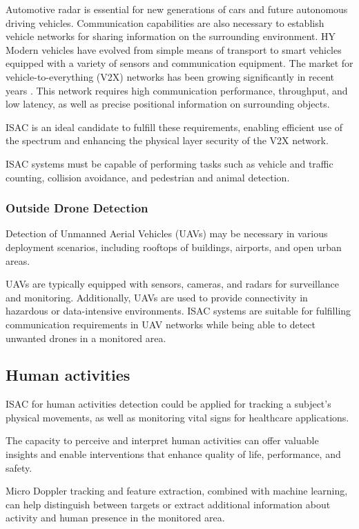 	Automotive radar is essential for new generations of cars and future autonomous driving vehicles.
	Communication capabilities are also necessary to establish vehicle networks for sharing information on the surrounding environment.
HY	Modern vehicles have evolved from simple means of transport to smart vehicles equipped with a variety of sensors and communication equipment.
	The market for vehicle-to-everything (V2X) networks has been growing significantly in recent years \cite{Liu_Masouros_2021}.
	This network requires high communication performance, throughput, and low latency, as well as precise positional information on surrounding objects.
	
	ISAC is an ideal candidate to fulfill these requirements, enabling efficient use of the spectrum and enhancing the physical layer security of the V2X network.
	
	ISAC systems must be capable of performing tasks such as vehicle and traffic counting, collision avoidance, and pedestrian and animal detection.
	
	\subsubsection{Outside Drone Detection}
	
	Detection of Unmanned Aerial Vehicles (UAVs) may be necessary in various deployment scenarios, including rooftops of buildings, airports, and open urban areas.
	
	UAVs are typically equipped with sensors, cameras, and radars for surveillance and monitoring. Additionally, UAVs are used to provide connectivity in hazardous or data-intensive environments.
	ISAC systems are suitable for fulfilling communication requirements in UAV networks while being able to detect unwanted drones in a monitored area.
	
	\subsection{Human activities}
	
	ISAC for human activities detection could be applied for tracking a subject's physical movements, as well as monitoring vital signs for healthcare applications. 
	
	The capacity to perceive and interpret human activities can offer valuable insights and enable interventions that enhance quality of life, performance, and safety.
	
	Micro Doppler tracking and feature extraction, combined with machine learning, can help distinguish between targets or extract additional information about activity and human presence in the monitored area.
	
